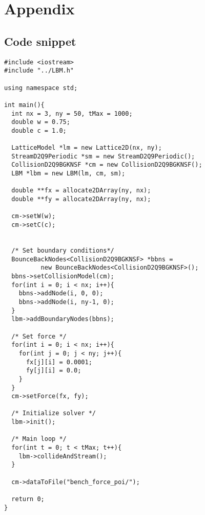 \chapter{Appendix}
\section{Code snippet}\label{app:poi_snippet}
\begin{verbatim}
#include <iostream>
#include "../LBM.h"

using namespace std;

int main(){
  int nx = 3, ny = 50, tMax = 1000;
  double w = 0.75;
  double c = 1.0;

  LatticeModel *lm = new Lattice2D(nx, ny);
  StreamD2Q9Periodic *sm = new StreamD2Q9Periodic();
  CollisionD2Q9BGKNSF *cm = new CollisionD2Q9BGKNSF();
  LBM *lbm = new LBM(lm, cm, sm);

  double **fx = allocate2DArray(ny, nx);
  double **fy = allocate2DArray(ny, nx);

  cm->setW(w);
  cm->setC(c);


  /* Set boundary conditions*/
  BounceBackNodes<CollisionD2Q9BGKNSF> *bbns =
          new BounceBackNodes<CollisionD2Q9BGKNSF>();
  bbns->setCollisionModel(cm);
  for(int i = 0; i < nx; i++){
    bbns->addNode(i, 0, 0);
    bbns->addNode(i, ny-1, 0);
  }
  lbm->addBoundaryNodes(bbns);

  /* Set force */
  for(int i = 0; i < nx; i++){
    for(int j = 0; j < ny; j++){
      fx[j][i] = 0.0001;
      fy[j][i] = 0.0;
    }
  }
  cm->setForce(fx, fy);

  /* Initialize solver */
  lbm->init();

  /* Main loop */
  for(int t = 0; t < tMax; t++){
    lbm->collideAndStream();
  }

  cm->dataToFile("bench_force_poi/");

  return 0;
}
\end{verbatim}
